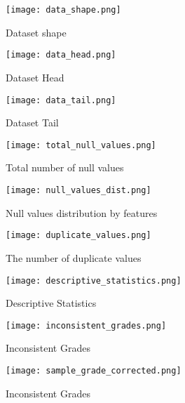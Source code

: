 \begin{figure} %
	\texttt{[image: data\_shape.png]}
	\caption{Dataset shape \label{fig:data_shape}}
\end{figure} 

\begin{figure}
	\texttt{[image: data\_head.png]}
	\caption{Dataset Head \label{fig:data_head}}
\end{figure}

\begin{figure}
	\texttt{[image: data\_tail.png]}
	\caption{Dataset Tail \label{fig:data_tail}}
 \end{figure}

\begin{figure} %
	\centering %
	\texttt{[image: total\_null\_values.png]}
	\caption{Total number of null values \label{fig:total_null_values}}
\end{figure}

\begin{figure} %
	\centering %
	\texttt{[image: null\_values\_dist.png]}
	\caption{Null values distribution by features \label{fig:null_values_dist}}
\end{figure}

\begin{figure}
	\centering %
	\texttt{[image: duplicate\_values.png]}
	\caption{The number of duplicate values \label{fig:duplicate_values}}
\end{figure}

\begin{figure}
	\centering %
	\texttt{[image: descriptive\_statistics.png]}
	\caption{Descriptive Statistics \label{fig:desc_stat}}
\end{figure}


\begin{figure}
	\centering %
	\texttt{[image: inconsistent\_grades.png]}
	\caption{Inconsistent Grades \label{fig:inconsistent_grades}}
\end{figure}

\begin{figure}
	\centering %
	\texttt{[image: sample\_grade\_corrected.png]}
	\caption{Inconsistent Grades \label{fig:sample_grade_corrected}}
\end{figure}

